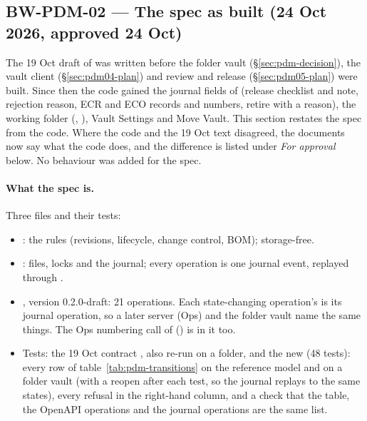 \subsection{BW-PDM-02 --- The spec as built (24 Oct 2026, approved 24 Oct)}\label{sec:pdm02-spec}

The 19 Oct draft of  was written before the folder vault (\S\ref{sec:pdm-decision}), the vault client
(\S\ref{sec:pdm04-plan}) and review and release (\S\ref{sec:pdm05-plan}) were built. Since then the code gained the
journal fields of  (release checklist and note, rejection reason, ECR and ECO records and numbers,
retire with a reason), the working folder (, ), Vault Settings and Move Vault. This
section restates the spec from the code. Where the code and the 19 Oct text disagreed, the documents now say what
the code does, and the difference is listed under \emph{For approval} below. No behaviour was added for the spec.

\paragraph{What the spec is.} Three files and their tests:
\begin{itemize}[nosep]
  \item {}: the rules (revisions, lifecycle, change control, BOM); storage-free.
  \item {}: files, locks and the journal; every operation is one journal event, replayed
        through .
  \item {}, version 0.2.0-draft: 21 operations. Each state-changing operation's
         is its journal operation, so a later server (Ops) and the folder vault name the same things.
        The Ops numbering call of  () is in it too.
  \item Tests: the 19 Oct contract , also re-run on a folder, and the new
         (48 tests): every row of table~\ref{tab:pdm-transitions} on the
        reference model and on a folder vault (with a reopen after each test, so the journal replays to the same
        states), every refusal in the right-hand column, and a check that the table, the OpenAPI operations and the
        journal operations are the same list.
\end{itemize}

